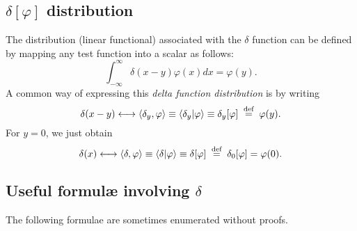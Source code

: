 \subsection{$\delta \left[ \varphi \right]$ distribution}

The distribution (linear functional) associated with the $\delta$ function
can be defined by mapping any test function into a scalar as follows:
\begin{equation}
\int_{-\infty}^\infty
\delta(x-y) \varphi (x) dx = \varphi(y).
\end{equation}
A common way of expressing this {\em delta function distribution} is by writing
\begin{equation}
\delta(x-y) \longleftrightarrow
\langle \delta_y , \varphi \rangle \equiv
\langle \delta_y \vert \varphi \rangle \equiv
\delta_y [\varphi] \stackrel{{\tiny \textrm{ def }}}{=} \varphi (y).
\end{equation}
For $y=0$, we just obtain
\begin{equation}
\delta(x) \longleftrightarrow
\langle \delta , \varphi \rangle \equiv
\langle \delta \vert \varphi \rangle \equiv
\delta [\varphi] \stackrel{{\tiny \textrm{ def }}}{=} \delta_0 [\varphi] =  \varphi (0).
\end{equation}



\subsection{Useful formul\ae{} involving $\delta$}

The following formulae are sometimes enumerated without proofs.


